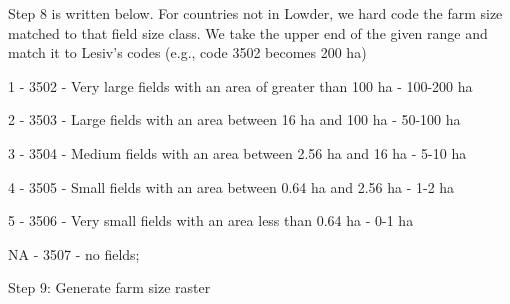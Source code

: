 \documentclass{article}
\begin{document}
Step 8 is written below. For countries not in Lowder, we hard code the farm size matched to that field size class. We take the upper end of the given range and match it to Lesiv's codes (e.g., code 3502 becomes 200 ha)


1  - 3502 - Very large fields with an area of greater than 100 ha  - 100-200 ha

2  - 3503 - Large fields with an area between 16 ha and 100 ha     - 50-100 ha

3  - 3504 - Medium fields with an area between 2.56 ha and 16 ha   - 5-10 ha

4  - 3505 - Small fields with an area between 0.64 ha and 2.56 ha  - 1-2 ha

5  - 3506 - Very small fields with an area less than 0.64 ha       - 0-1 ha

NA - 3507 - no fields;


\begin{Schunk}
\end{Schunk}

Step 9: Generate farm size raster
\end{document}
